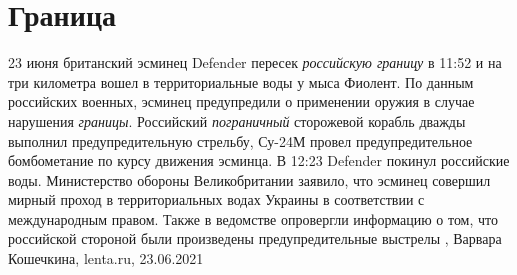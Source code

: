  
 
 
 
 
\chapter{Граница}
\label{sec:slova.granica}

23 июня британский эсминец Defender пересек \emph{российскую границу} в 11:52 и на три
километра вошел в территориальные воды у мыса Фиолент. По данным российских
военных, эсминец предупредили о применении оружия в случае нарушения \emph{границы}.
Российский \emph{пограничный} сторожевой корабль дважды выполнил предупредительную
стрельбу, Су-24М провел предупредительное бомбометание по курсу движения
эсминца. В 12:23 Defender покинул российские воды.  Министерство обороны
Великобритании заявило, что эсминец совершил мирный проход в территориальных
водах Украины в соответствии с международным правом. Также в ведомстве
опровергли информацию о том, что российской стороной были произведены
предупредительные выстрелы
, 
Варвара Кошечкина, lenta.ru, 23.06.2021

